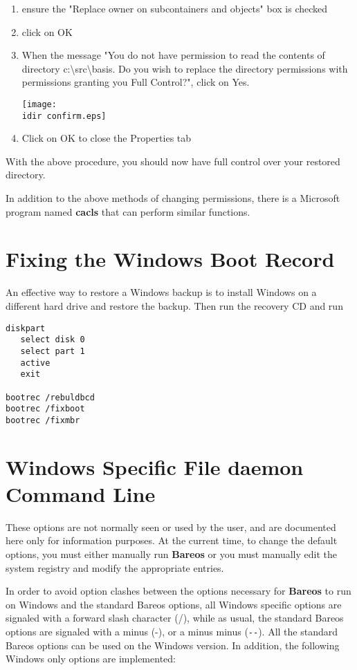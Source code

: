 {\begin{enumerate}
\texttt{[image: \\idir properties-security-advanced-owner.eps]}
\item ensure the "Replace owner on subcontainers and objects" box is
   checked
\item click on OK
\item When the message "You do not have permission to read the contents of
   directory c:\textbackslash{}src\textbackslash{}basis. Do you wish to replace
   the directory permissions with permissions granting you Full Control?", click
on Yes.

\texttt{[image: \\idir confirm.eps]}
\item Click on OK to close the Properties tab
   \end{enumerate}

With the above procedure, you should now have full control over your restored
directory.

In addition to the above methods of changing permissions, there is a Microsoft
program named {\bf cacls} that can perform similar functions.
}


\section{Fixing the Windows Boot Record}

An effective way to restore a Windows backup is to install Windows on a different
hard drive and restore the backup.  Then run the
recovery CD and run

\begin{verbatim}
diskpart
   select disk 0
   select part 1
   active
   exit

bootrec /rebuldbcd
bootrec /fixboot
bootrec /fixmbr
\end{verbatim}


\section{Windows Specific File daemon Command Line}

These options are not normally seen or used by the user, and are documented
here only for information purposes. At the current time, to change the default
options, you must either manually run {\bf Bareos} or you must manually edit
the system registry and modify the appropriate entries.

In order to avoid option clashes between the options necessary for {\bf
Bareos} to run on Windows and the standard Bareos options, all Windows
specific options are signaled with a forward slash character (/), while as
usual, the standard Bareos options are signaled with a minus (-), or a minus
minus (\verb:--:). All the standard Bareos options can be used on the Windows
version. In addition, the following Windows only options are implemented:

